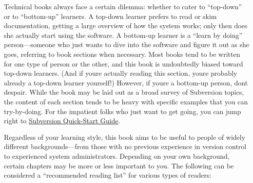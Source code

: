 Technical books always face a certain dilemma: whether to cater to
``top-down'' or to ``bottom-up'' learners. A top-down learner prefers to
read or skim documentation, getting a large overview of how the system
works; only then does she actually start using the software. A bottom-up
learner is a ``learn by doing'' person---someone who just wants to dive
into the software and figure it out as she goes, referring to book
sections when necessary. Most books tend to be written for one type of
person or the other, and this book is undoubtedly biased toward top-down
learners. (And if you\textquotesingle re actually reading this section,
you\textquotesingle re probably already a top-down learner yourself!)
However, if you\textquotesingle re a bottom-up person,
don\textquotesingle t despair. While the book may be laid out as a broad
survey of Subversion topics, the content of each section tends to be
heavy with specific examples that you can try-by-doing. For the
impatient folks who just want to get going, you can jump right to
\hyperref[svn.intro]{Subversion Quick-Start Guide}.

Regardless of your learning style, this book aims to be useful to people
of widely different backgrounds---from those with no previous experience
in version control to experienced system administrators. Depending on
your own background, certain chapters may be more or less important to
you. The following can be considered a ``recommended reading list'' for
various types of readers:

